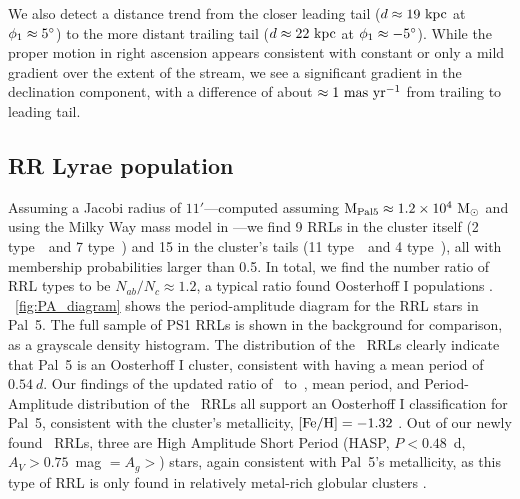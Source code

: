 \documentclass[twocolumn]{aastex63}
\newcommand{\sa}[1]{{\color{teal} SP: #1}}
\begin{document}
We also detect a distance trend from the closer leading tail ($d \approx 19~\mathrm{kpc}$ at $\phi_1 \approx 5\mbox{$^\circ$}$) to the more distant trailing tail ($d \approx 22~\mathrm{kpc}$ at $\phi_1 \approx -5\mbox{$^\circ$}$).
While the proper motion in right ascension appears consistent with constant or only a mild gradient over the extent of the stream, we see a significant gradient in the declination component, with a difference of about $\approx 1~\mathrm{mas}~\mathrm{yr}^{-1}$ from trailing to leading tail.

\subsection{RR Lyrae population }

Assuming a Jacobi radius of $11'$---computed assuming $\textrm{M}_{\rm Pal 5} \approx 1.2\times10^4~\mathrm{M}_\odot$ \citep{Kuepper:2015} and using the Milky Way mass model in \citet{gala}---we find 9 RRLs in the cluster itself (2 type~\typeab\ and 7 type~\typec) and 15 in the cluster's tails (11 type~\typeab\ and 4 type~\typec), all  with membership probabilities larger than 0.5. In total, we find the number ratio of RRL types to be $N_{ab} / N_{c} \approx 1.2$, a typical ratio found Oosterhoff I populations \citep{Smith1995}.  
\figurename~\ref{fig:PA_diagram} shows the period-amplitude diagram for the RRL stars in Pal~5.
The full sample of PS1 RRLs is shown in the background for comparison, as a grayscale density histogram. The distribution of the \typeab~RRLs clearly indicate that Pal~5 is an Oosterhoff I cluster, consistent with having a mean period of $0.54~d$.
Our findings of the updated ratio of \rrab~to~\rrc, mean period, and Period-Amplitude distribution of the \rrab\ RRLs all support an Oosterhoff I classification for Pal~5, consistent with the cluster's metallicity, $[\mathrm{Fe}/\mathrm{H}]=-1.32$ \citep{TODO}.
Out of our newly found \rrab\ RRLs, three are High Amplitude Short Period (HASP, $P <0.48$~d, $A_V>0.75$~mag $=A_g>$) stars, again consistent with Pal~5's metallicity,  as this type of RRL is only found in relatively metal-rich globular clusters  \citep[$\FeH>-1.5$;][]{Monelli:2017}.

\end{document}
